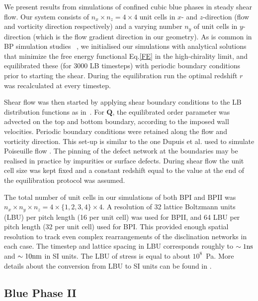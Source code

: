 \documentclass[12pt,twoside]{iopart}
\begin{document}
We present results from simulations of confined cubic blue
phases in steady shear flow.
Our system consists of $n_x\times n_z = 4\times4$ unit cells in $x$-
and $z$-direction (flow and vorticity direction respectively) and a varying
number $n_y$ of unit cells in $y$-direction (which is the flow gradient
direction in our geometry).
As is common in BP simulation studies ~\cite{Henrich:2011a,Henrich:2010b}, we initialised our simulations with analytical solutions that minimize the free energy functional Eq.\ref{FE} in the high-chirality limit, and equilibrated these (for 3000 LB timesteps) with periodic boundary conditions prior to starting the shear. During the equilibration run the optimal redshift $r$ was recalculated at every timestep.

Shear flow was then started by applying shear boundary conditions to the LB distribution functions as in~\cite{Denniston:2004}. For ${\mathbf Q}$, the equilibrated order parameter was advected on the top and bottom boundary, according to the imposed wall velocities. Periodic boundary conditions were retained along the flow and vorticity direction.
This set-up is similar to the one Dupuis et al. used to simulate Poiseuille flow \cite{Dupuis:2005}. The pinning of the defect network at the boundaries may be realised in practice by impurities or surface defects.
During shear flow the unit cell size was kept fixed and a constant redshift equal to the value at the end of the equilibration protocol was assumed.

The total number of unit cells in our simulations of both BPI and BPII
was $n_x\times n_y \times n_z= 4 \times \{1,2,3,4\} \times 4$.
A resolution of 32 lattice Boltzmann units (LBU) per pitch length
(16 per unit cell) was used for BPII, and 64 LBU per pitch length
(32 per unit cell) used for BPI.  
This provided enough spatial resolution to track even complex rearrangements
of the disclination networks in each case.
The timestep and lattice spacing in LBU corresponds roughly to
$\sim 1 {\rm ns}$ and $\sim 10{\rm nm}$ in SI units. The LBU of stress
is equal to about $10^8$~Pa. 
More details about the conversion from LBU to SI units can be found in
\cite{Henrich:2011a,Henrich:2010b}.

\subsection{Blue Phase II}\label{sec_bpii}
\end{document}
